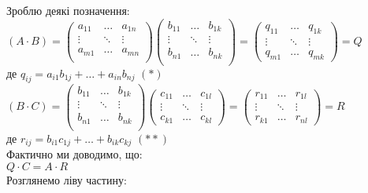 \documentclass[a4paper, 10pt]{article}
\theoremstyle{theoremdd}
\theoremstyle{theoremdd}
\theoremstyle{theoremdd}
\theoremstyle{theoremdd}
\theoremstyle{theoremdd}
\theoremstyle{theoremdd}
\theoremstyle{theoremdd}
\theoremstyle{theoremdd}
\begin{document}
	Зроблю деякі позначення: \\ $(A \cdot B) = \begin{pmatrix}
	a_{11} & \dots & a_{1n} \\
	\vdots & \ddots & \vdots \\
	a_{m1} & \dots & a_{mn} \\
	\end{pmatrix} \begin{pmatrix}
	b_{11} & \dots & b_{1k} \\
	\vdots & \ddots & \vdots \\
	b_{n1} & \dots & b_{nk} \\
	\end{pmatrix} = \begin{pmatrix}
	q_{11} & \dots & q_{1k} \\
	\vdots & \ddots & \vdots \\
	q_{m1} & \dots & q_{mk}
	\end{pmatrix} = Q$\\
	де $q_{ij} = a_{i1}b_{1j} + \dots + a_{in}b_{nj}$ $(*)$\\
	$(B \cdot C) = \begin{pmatrix}
	b_{11} & \dots & b_{1k} \\
	\vdots & \ddots & \vdots \\
	b_{n1} & \dots & b_{nk} \\
	\end{pmatrix} \begin{pmatrix}
	c_{11} & \dots & c_{1l} \\
	\vdots & \ddots & \vdots \\
	c_{k1} & \dots & c_{kl}
	\end{pmatrix} = \begin{pmatrix}
	r_{11} & \dots & r_{1l} \\
	\vdots & \ddots & \vdots \\
	r_{k1} & \dots & r_{nl}
	\end{pmatrix} = R$ \\
	де $r_{ij} = b_{i1}c_{1j} + \dots + b_{ik}c_{kj}$ $(**)$\\
	Фактично ми доводимо, що:\\
	$Q \cdot C = A \cdot R$\\
	Розглянемо ліву частину:\\
\end{document}
